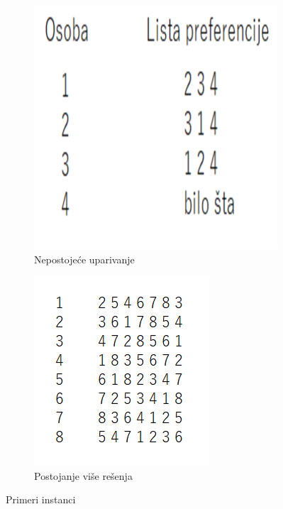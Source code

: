 \documentclass[a4paper]{article}
\begin{document}
\begin{figure}[htb]
\centering
  \begin{subfigure}{0.4\textwidth}
    \centering
    \includegraphics[width=\linewidth]{nepostoji.png}
    \caption{Nepostojeće uparivanje}
    \label{fig:nepostojece}
  \end{subfigure}
  \begin{subfigure}{0.4\textwidth}
    \centering
    \includegraphics[width=\linewidth]{viseresenja.png}
    \caption{Postojanje više rešenja}
    \label{fig:viseresenja}
  \end{subfigure}
  \caption{Primeri instanci}
\end{figure}
\end{document}
